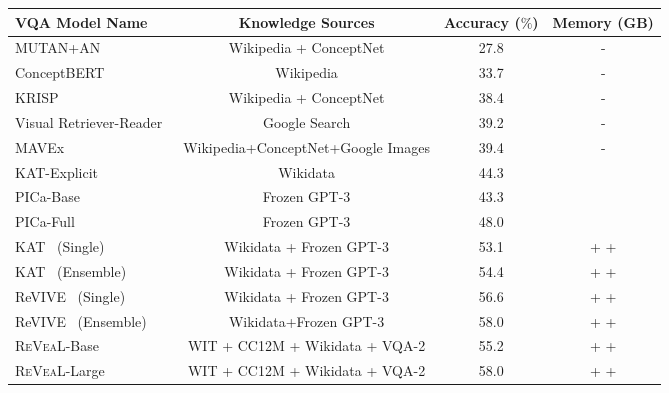 \documentclass[10pt,twocolumn,letterpaper]{article}
\newcommand{\method}{R\textsc{e}V\textsc{ea}L\xspace}
\begin{document}
\begin{table*}[t!]
\centering
\small
    \vspace{-.4in}
\begin{tabular}{l|c|c|c} \toprule
\textbf{VQA Model Name}    &  \textbf{Knowledge Sources} & \textbf{Accuracy ($\%$)} & \textbf{Memory (GB)} \\  \midrule
 MUTAN+AN~\cite{DBLP:conf/cvpr/MarinoRFM19}   & Wikipedia + ConceptNet          & 27.8 & -   \\ 
ConceptBERT~\cite{DBLP:conf/emnlp/GarderesZAL20}   &  Wikipedia          & 33.7 & -   \\
 KRISP~\cite{DBLP:conf/cvpr/MarinoCP0R21}   &  Wikipedia + ConceptNet         & 38.4 & -   \\
 Visual Retriever-Reader~\cite{DBLP:conf/emnlp/LuoZBB21}   &  Google Search          & 39.2 & -    \\
 MAVEx~\cite{DBLP:conf/aaai/WuLSM22}   &  Wikipedia+ConceptNet+Google Images          & 39.4 & -   \\
 KAT-Explicit~\cite{DBLP:conf/naacl/GuiWH0BG22}   &  Wikidata     & 44.3 & \color{green}{1.5} \\
 \midrule
PICa-Base~\cite{DBLP:journals/corr/abs-2109-05014}   & Frozen GPT-3     & 43.3 & \color{blue}{350}   \\ 
PICa-Full~\cite{DBLP:journals/corr/abs-2109-05014}     &  Frozen GPT-3          & 48.0 & \color{blue}{350}    \\
KAT~\cite{DBLP:conf/naacl/GuiWH0BG22} (Single)   &  Wikidata + Frozen GPT-3        & 53.1 & \color{green}{1.5} + \color{blue}{352}+ \color{red}{500}   \\
KAT~\cite{DBLP:conf/naacl/GuiWH0BG22}  (Ensemble)   &  Wikidata + Frozen GPT-3         & 54.4 & \color{green}{4.6} + \color{blue}{352} + \color{red}{500}   \\
ReVIVE~\cite{DBLP:journals/corr/abs-2206-01201} (Single)   &  Wikidata + Frozen GPT-3       & 56.6 & \color{green}{1.5} + \color{blue}{354} + \color{red}{500}   \\ 
ReVIVE~\cite{DBLP:journals/corr/abs-2206-01201} (Ensemble)   &  Wikidata+Frozen GPT-3        & 58.0 & \color{green}{4.6} + \color{blue}{354} + \color{red}{500}\\ \midrule
\method-Base   &  WIT + CC12M + Wikidata + VQA-2      & 55.2 & \color{green}{0.8} + \color{blue}{7.5} + \color{red}{744}  \\
\method-Large   &  WIT + CC12M + Wikidata + VQA-2      & 58.0 & \color{green}{2.8} + \color{blue}{10} + \color{red}{993}  \\

\end{tabular}
\end{table*}
\end{document}
